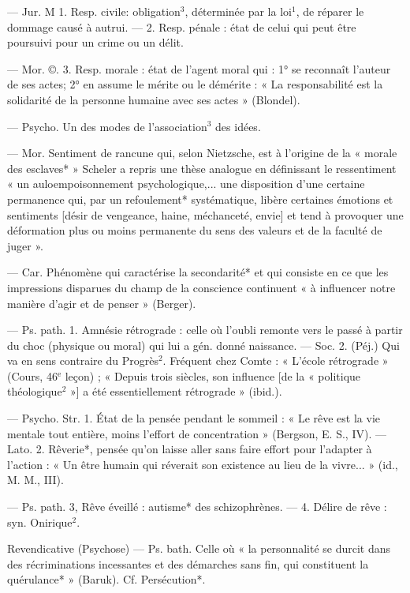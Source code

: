 \begin{itemize}[leftmargin=1cm, label=, itemsep=1pt]
 — Jur. M 1. Resp. civile:
obligation$^3$, déterminée par la loi$^1$,
de réparer le dommage causé à
autrui. — 2. Resp. pénale : état de
celui qui peut être poursuivi pour
un crime ou un délit.

— Mor. ©. 3. Resp. morale : état de
l'agent moral qui : 1° se reconnaît
l’auteur de ses actes; 2° en assume
le mérite ou le démérite : « La responsabilité est la solidarité de la
personne humaine avec ses actes »
(Blondel).

 —
Psycho. Un des modes de l’association$^3$ des idées.

 — Mor. Sentiment de
rancune qui, selon Nietzsche, est à
l’origine de la « morale des esclaves* »
Scheler a repris une thèse analogue
en définissant le ressentiment « un
auloempoisonnement psychologique,...
une disposition d'une certaine permanence qui, par un refoulement*
systématique, libère certaines émotions et sentiments [désir de vengeance, haine, méchanceté, envie]
et tend à provoquer une déformation plus ou moins permanente du
sens des valeurs et de la faculté de
juger ».

 — Car. Phénomène
qui caractérise la secondarité* et
qui consiste en ce que les impressions disparues du champ de la
conscience continuent « à influencer
notre manière d'agir et de penser »
(Berger).

 — Ps. path. 1. Amnésie
rétrograde : celle où l'oubli remonte
vers le passé à partir du choc (physique ou moral) qui lui a gén. donné
naissance. — Soc. 2. (Péj.) Qui va
en sens contraire du Progrès$^2$. Fréquent chez Comte : « L'école rétrograde » (Cours, 46$^\text{e}$ leçon) ; « Depuis
trois siècles, son influence [de la
« politique théologique$^2$ »] a été essentiellement rétrograde » (ibid.).

 — Psycho. Str. 1. État de la
pensée pendant le sommeil : « Le
rêve est la vie mentale tout entière,
moins l'effort de concentration »
(Bergson, E. S., IV). — Lato. 2. Rêverie*, pensée qu'on laisse aller sans
faire effort pour l'adapter à l’action :
« Un être humain qui réverait son
existence au lieu de la vivre... » (id.,
M. M., III).

— Ps. path. 3, Rêve éveillé : autisme* des schizophrènes. — 4. Délire de rêve : syn. Onirique$^2$.

Revendicative (Psychose)\ib{} — Ps.
bath. Celle où « la personnalité se
durcit dans des récriminations incessantes et des démarches sans fin,
qui constituent la quérulance* »
(Baruk). Cf. Persécution*.


\end{itemize}
